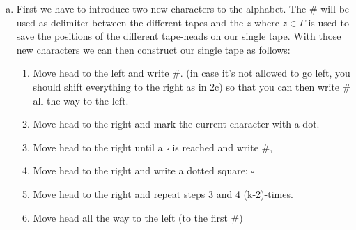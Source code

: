 \documentclass{article} %
\begin{document}
\begin{enumerate}[(a)]
\item
First we have to introduce two new characters to the alphabet. The $\#$ will be used as delimiter between the different tapes and the $\dot{z}$ where $z \in \Gamma$ is used to save the positions of the different tape-heads on our single tape. With those new characters we can then construct our single tape as follows:
\begin{enumerate}[1.]
\item Move head to the left and write $\#$. (in case it's not allowed to go left, you should shift everything to the right as in 2c) so that you can then write $\#$ all the way to the left.
\item Move head to the right and mark the current character with a dot.
\item Move head to the right until a $\square$ is reached and write $\#$,
\item Move head to the right and write a dotted square: $\dot{\square}$
\item Move head to the right and repeat steps 3 and 4 (k-2)-times.
\item Move head all the way to the left (to the first $\#$)
\end{enumerate}


\end{enumerate}
\end{document}
